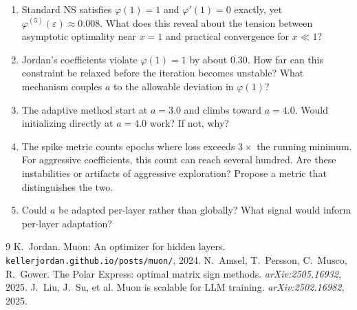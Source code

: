 \documentclass[11pt,a4paper]{article}
\newcommand{\poly}{\varphi}
\begin{document}
\begin{enumerate}
    \item Standard NS satisfies $\poly(1)=1$ and $\poly'(1)=0$ exactly, yet
          $\poly^{(5)}(\varepsilon) \approx 0.008$.  What does this reveal
          about the tension between asymptotic optimality near $x=1$ and
          practical convergence for $x \ll 1$?

    \item Jordan's coefficients violate $\poly(1)=1$ by about $0.30$.
          How far can this constraint be relaxed before the iteration
          becomes unstable?  What mechanism couples $a$ to the allowable deviation
          in $\poly(1)$?

    \item The adaptive method start at $a=3.0$ and climbs toward $a=4.0$.
          Would initializing directly at $a=4.0$ work?  If not, why?

    \item The spike metric counts epochs where loss exceeds $3\times$
          the running minimum.  For aggressive coefficients, this count
          can reach several hundred.  Are these instabilities
          or artifacts of aggressive exploration?  Propose a metric
          that distinguishes the two.

    \item Could $a$ be adapted per-layer rather than globally?  What signal would inform per-layer adaptation?
\end{enumerate}

\begin{thebibliography}{9}
 K.~Jordan.  Muon: An optimizer for hidden layers.
  \texttt{kellerjordan.github.io/posts/muon/}, 2024.
 N.~Amsel, T.~Persson, C.~Musco, R.~Gower.
  The Polar Express: optimal matrix sign methods.  \textit{arXiv:2505.16932}, 2025.
 J.~Liu, J.~Su, et al.  Muon is scalable for LLM training.
  \textit{arXiv:2502.16982}, 2025.
\end{thebibliography}
\end{document}
